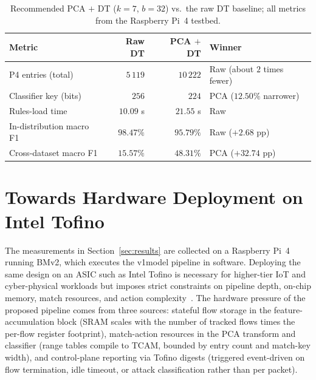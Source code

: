 \documentclass[runningheads]{llncs}
\begin{document}
\begin{table}[t]
\centering
\setlength{\tabcolsep}{4pt}
\caption{Recommended PCA $+$ DT ($k{=}7$, $b{=}32$) vs.\ the raw DT baseline; all metrics from the Raspberry Pi~4 testbed.}
\label{tab:vs_raw}
\begin{tabular}{l r r l}
\toprule
\textbf{Metric} & \textbf{Raw DT} & \textbf{PCA $+$ DT} & \textbf{Winner} \\
\midrule
P4 entries (total)        & $5\,119$       & $10\,222$    & Raw (about $2$ times fewer) \\
Classifier key (bits)     & $256$       & $224$        & PCA ($12.50\%$ narrower) \\
Rules-load time           & $10.09$ s   & $21.55$ s    & Raw \\
In-distribution macro F1  & $98.47\%$   & $95.79\%$    & Raw ($+2.68$ pp) \\
Cross-dataset macro F1    & $15.57\%$   & $48.31\%$    & PCA ($+32.74$ pp) \\
\bottomrule
\end{tabular}
\end{table}

\section{Towards Hardware Deployment on Intel Tofino}\label{sec:tofino}

The measurements in Section~\ref{sec:results} are collected on a Raspberry Pi~4 running BMv2, which executes the v1model pipeline in software. Deploying the same design on an ASIC such as Intel Tofino is necessary for higher-tier IoT and cyber-physical workloads but imposes strict constraints on pipeline depth, on-chip memory, match resources, and action complexity~\cite{Bosshart2013}. The hardware pressure of the proposed pipeline comes from three sources: stateful flow storage in the feature-accumulation block (SRAM scales with the number of tracked flows times the per-flow register footprint), match-action resources in the PCA transform and classifier (range tables compile to TCAM, bounded by entry count and match-key width), and control-plane reporting via Tofino digests (triggered event-driven on flow termination, idle timeout, or attack classification rather than per packet).
\end{document}
